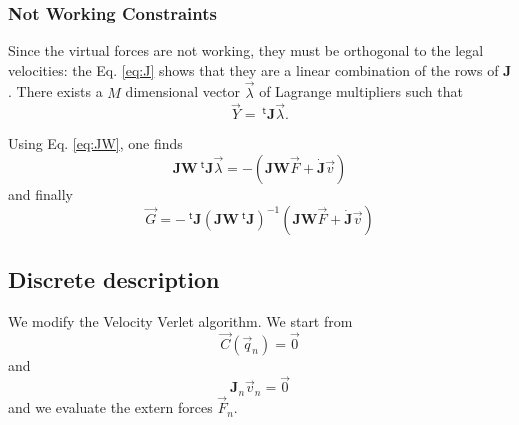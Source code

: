 \documentclass[aps,twocolumn]{revtex4}
\newcommand{\mymat}[1]{\boldsymbol{#1}}
\newcommand{\mytrn}[1]{{\!\!~^{\mathsf{t}}{#1}}}
\begin{document}
\subsubsection{Not Working Constraints}
Since the virtual forces are not working, they must be orthogonal to the legal velocities: the Eq. \eqref{eq:J}
shows that they are a linear combination of the rows of $\mymat{J}$.
There exists a $M$ dimensional vector $\vec{\lambda}$ 
of Lagrange multipliers
such that
\begin{equation}
	\vec{Y} = \mytrn{\mymat{J}}\vec{\lambda}.
\end{equation}

Using Eq. \eqref{eq:JW}, one finds
\begin{equation}
	\mymat{J}\mymat{W} \mytrn{\mymat{J}}\vec{\lambda} = -\left(\mymat{J}\mymat{W}\vec{F} + \dot{\mymat{J}}\vec{v}\right)
\end{equation}
and finally
\begin{equation}
	\vec{G} = - \mytrn{\mymat{J}}\left(\mymat{J}\mymat{W} \mytrn{\mymat{J}}\right)^{-1}\left(\mymat{J}\mymat{W}\vec{F} + \dot{\mymat{J}}\vec{v}\right)
\end{equation}

\subsection{Discrete description}

We modify the Velocity Verlet algorithm.
We start from
$$
	\vec{C}(\vec{q}_n)=\vec{0}  
$$
and
$$
 \mymat{J}_n \vec{v}_n = \vec{0}
$$
and we evaluate the extern forces $\vec{F}_n$.
\end{document}

